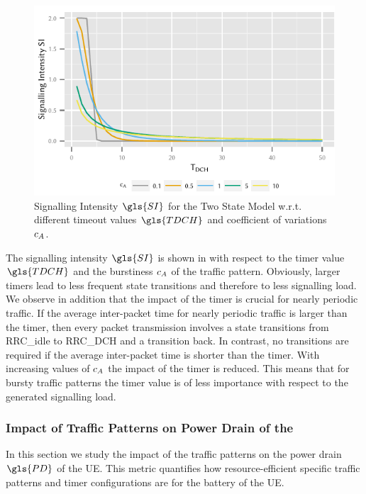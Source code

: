 \begin{figure}
	\centering
	\includegraphics{network/performance_model/numerical_examples/figures/2state_tdch_si}
	\caption{Signalling Intensity \(\gls{SI}\) for the Two State Model w.r.t. different timeout values \(\gls{TDCH}\) and coefficient of variations \(c_{A}\).}
	\label{fig:network:performance_model:numerical_examples:validations:analytic_vs_simulation:2state_tdch_si}
\end{figure}


The signalling intensity \(\gls{SI}\) is shown in  with respect to the timer value \(\gls{TDCH}\) and the burstiness \(c_{A}\) of the traffic pattern.
Obviously, larger timers lead to less frequent state transitions and therefore to less signalling load.
We observe in addition that the impact of the timer is crucial for nearly periodic traffic.
If the average inter-packet time for nearly periodic traffic is larger than the timer, then every packet transmission involves a state transitions from \gls{RRC_idle} to \gls{RRC_DCH} and a transition back.
In contrast, no transitions are required if the average inter-packet time is shorter than the timer.
With increasing values of \(c_{A}\) the impact of the timer is reduced.
This means that for bursty traffic patterns the timer value is of less importance with respect to the generated signalling load.

\subsubsection*{Impact of Traffic Patterns on Power Drain of the }\label{sec:network:performance_model:power_drain}
In this section we study the impact of the traffic patterns on the power drain \(\gls{PD}\) of the \gls{UE}.
This metric quantifies how resource-efficient specific traffic patterns and timer configurations are for the battery of the \gls{UE}.


